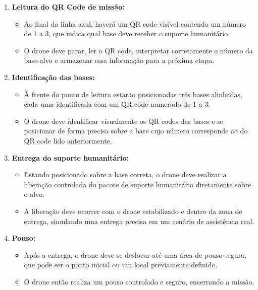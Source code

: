 \begin{itemize}
\begin{itemize}
\begin{enumerate}
            \item \textbf{Leitura do QR Code de missão:}
            \begin{itemize}
                \item Ao final da linha azul, haverá um QR code visível contendo um número de 1 a 3, que indica qual base deve receber o suporte humanitário.
                \item O drone deve parar, ler o QR code, interpretar corretamente o número da base-alvo e armazenar essa informação para a próxima etapa.
            \end{itemize}
            
            \item \textbf{Identificação das bases:}
            \begin{itemize}
                \item À frente do ponto de leitura estarão posicionadas três bases alinhadas, cada uma identificada com um QR code numerado de 1 a 3.
                \item O drone deve identificar visualmente os QR codes das bases e se posicionar de forma precisa sobre a base cujo número corresponde ao do QR code lido anteriormente.
            \end{itemize}
            
            \item \textbf{Entrega do suporte humanitário:}
            \begin{itemize}
                \item Estando posicionado sobre a base correta, o drone deve realizar a liberação controlada do pacote de suporte humanitário diretamente sobre o alvo.
                \item A liberação deve ocorrer com o drone estabilizado e dentro da zona de entrega, simulando uma entrega precisa em um cenário de assistência real.
            \end{itemize}
            
            \item \textbf{Pouso:}
            \begin{itemize}
                \item Após a entrega, o drone deve se deslocar até uma área de pouso segura, que pode ser o ponto inicial ou um local previamente definido.
                \item O drone então realiza um pouso controlado e seguro, encerrando a missão.
            \end{itemize}
        \end{enumerate}
        

\end{itemize}
\end{itemize}
